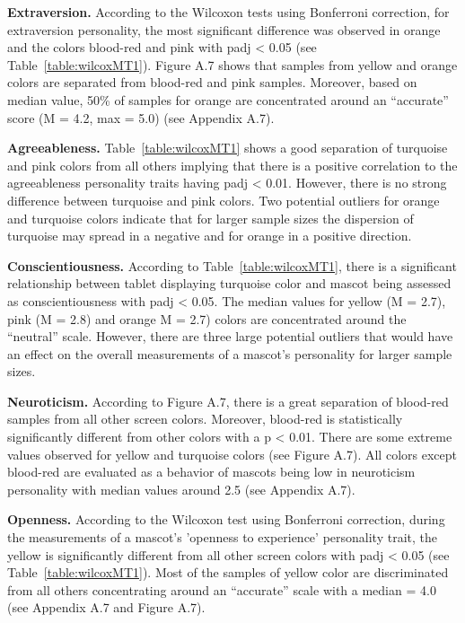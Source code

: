 \par \textbf{Extraversion.} According to the Wilcoxon tests using Bonferroni correction, for extraversion personality,
the most significant difference was observed in orange and the colors blood-red and pink with padj < 0.05
(see Table~\ref{table:wilcoxMT1}). Figure A.7 shows that samples from yellow and orange colors are separated
from blood-red and pink samples. Moreover, based on median value, 50\% of samples for orange are concentrated around
an “accurate” score (M = 4.2, max = 5.0) (see Appendix A.7).
\par \textbf{Agreeableness.} Table~\ref{table:wilcoxMT1} shows a good separation of turquoise and pink colors
from all others implying that there is a positive correlation to the agreeableness personality traits having
padj < 0.01. However, there is no strong difference between turquoise and pink colors. Two potential outliers for
orange and turquoise colors indicate that for larger sample sizes the dispersion of turquoise may spread in a negative
and for orange in a positive direction.
\par \textbf{Conscientiousness.} According to Table~\ref{table:wilcoxMT1}, there is a significant relationship between
tablet displaying turquoise color and mascot being assessed as conscientiousness with padj < 0.05. The median values
for yellow (M = 2.7), pink (M = 2.8) and orange M = 2.7) colors are concentrated around the “neutral” scale. However,
there are three large potential outliers that would have an effect on the overall measurements of a mascot's
personality for larger sample sizes.
\par \textbf{Neuroticism.} According to Figure A.7, there is a great separation of blood-red samples from all other
screen colors. Moreover, blood-red is statistically significantly different from other colors with a p < 0.01. There
are some extreme values observed for yellow and turquoise colors (see Figure A.7). All colors except blood-red are
evaluated as a behavior of mascots being low in neuroticism personality with median values around 2.5 (see Appendix A.7).
\par \textbf{Openness.} According to the Wilcoxon test using Bonferroni correction, during the measurements of a
mascot's 'openness to experience' personality trait, the yellow is significantly different from all other screen
colors with padj < 0.05 (see Table~\ref{table:wilcoxMT1}). Most of the samples of yellow color are discriminated
from all others concentrating around an “accurate” scale with a median = 4.0 (see Appendix A.7 and Figure A.7).

